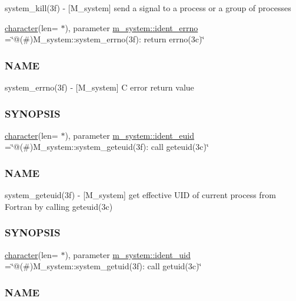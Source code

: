 \begin{DoxyCompactItemize}
\begin{DoxyCompactList}
system\+\_\+kill(3f) -\/ \mbox{[}M\+\_\+system\mbox{]} send a signal to a process or a group of processes \end{DoxyCompactList}\item 
\hyperlink{option__stopwatch_83_8txt_abd4b21fbbd175834027b5224bfe97e66}{character}(len= $\ast$), parameter \hyperlink{namespacem__system_af87dabd7c9a2c38ccb3794b5185f24d8}{m\+\_\+system\+::ident\+\_\+errno} =\char`\"{}@(\#)M\+\_\+system\+::system\+\_\+errno(3f)\+: return errno(3c)\char`\"{}
\begin{DoxyCompactList}\small\item\em \subsubsection*{N\+A\+ME}

system\+\_\+errno(3f) -\/ \mbox{[}M\+\_\+system\mbox{]} C error return value \subsubsection*{S\+Y\+N\+O\+P\+S\+IS}\end{DoxyCompactList}\item 
\hyperlink{option__stopwatch_83_8txt_abd4b21fbbd175834027b5224bfe97e66}{character}(len= $\ast$), parameter \hyperlink{namespacem__system_a20fffb77817fdd355846c7d6f21f5a15}{m\+\_\+system\+::ident\+\_\+euid} =\char`\"{}@(\#)M\+\_\+system\+::system\+\_\+geteuid(3f)\+: call geteuid(3c)\char`\"{}
\begin{DoxyCompactList}\small\item\em \subsubsection*{N\+A\+ME}

system\+\_\+geteuid(3f) -\/ \mbox{[}M\+\_\+system\mbox{]} get effective U\+ID of current process from Fortran by calling geteuid(3c) \subsubsection*{S\+Y\+N\+O\+P\+S\+IS}\end{DoxyCompactList}\item 
\hyperlink{option__stopwatch_83_8txt_abd4b21fbbd175834027b5224bfe97e66}{character}(len= $\ast$), parameter \hyperlink{namespacem__system_ab80f033f884f3c88c3c010826143b6f5}{m\+\_\+system\+::ident\+\_\+uid} =\char`\"{}@(\#)M\+\_\+system\+::system\+\_\+getuid(3f)\+: call getuid(3c)\char`\"{}
\begin{DoxyCompactList}\small\item\em \subsubsection*{N\+A\+ME}


\end{DoxyCompactList}
\end{DoxyCompactItemize}
